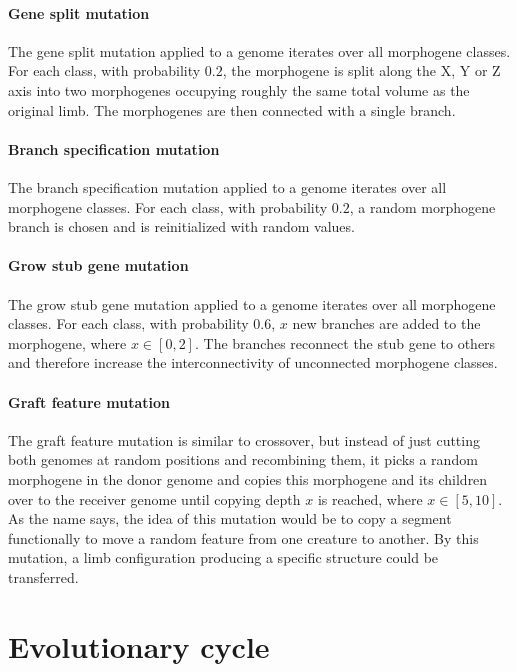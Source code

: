 \documentclass[main]{subfiles}
\begin{document}
\paragraph{Gene split mutation}

The gene split mutation applied to a genome iterates over all morphogene classes. For each class, with probability $0.2$, the morphogene is split along the X, Y or Z axis into two morphogenes occupying roughly the same total volume as the original limb. The morphogenes are then connected with a single branch.

\paragraph{Branch specification mutation}

The branch specification mutation applied to a genome iterates over all morphogene classes. For each class, with probability $0.2$, a random morphogene branch is chosen and is reinitialized with random values. 

\paragraph{Grow stub gene mutation}

The grow stub gene mutation applied to a genome iterates over all morphogene classes. For each class, with probability $0.6$, $x$ new branches are added to the morphogene, where $x \in [0,2]$. The branches reconnect the stub gene to others and therefore increase the interconnectivity of unconnected morphogene classes.

\paragraph{Graft feature mutation}

The graft feature mutation is similar to crossover, but instead of just cutting both genomes at random positions and recombining them, it picks a random morphogene in the donor genome and copies this morphogene and its children over to the receiver genome until copying depth $x$ is reached, where $x \in [5,10]$. As the name says, the idea of this mutation would be to copy a segment functionally to move a random feature from one creature to another. By this mutation, a limb configuration producing a specific structure could be transferred.

\section{Evolutionary cycle}
\end{document}
